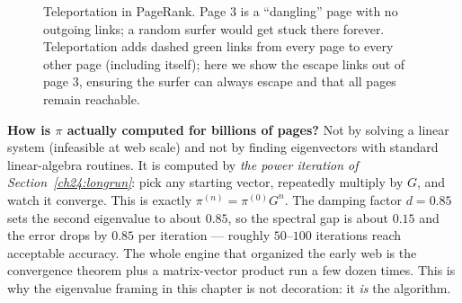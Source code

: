 \begin{figure}[H]
  \centering
  \caption{Teleportation in PageRank. Page 3 is a ``dangling'' page with no outgoing links; a random surfer would get stuck there forever. Teleportation adds dashed green links from every page to every other page (including itself); here we show the escape links out of page 3, ensuring the surfer can always escape and that all pages remain reachable.}
  \label{ch24:fig-teleportation}
\end{figure}

\begin{happeningbox}
\textbf{How is $\pi$ actually computed for billions of pages?} Not by solving a
linear system (infeasible at web scale) and not by finding eigenvectors with
standard linear-algebra routines. It is computed by \emph{the power iteration of
Section~\ref{ch24:longrun}}: pick any starting vector, repeatedly multiply by $G$,
and watch it converge. This is exactly $\pi^{(n)} = \pi^{(0)} G^n$. The damping
factor $d=0.85$ sets the second eigenvalue to about $0.85$, so the spectral gap is
about $0.15$ and the error drops by $0.85$ per iteration --- roughly $50$--$100$
iterations reach acceptable accuracy. The whole engine that organized the early
web is the convergence theorem plus a matrix-vector product run a few dozen times.
This is why the eigenvalue framing in this chapter is not decoration: it
\emph{is} the algorithm.
\end{happeningbox}

